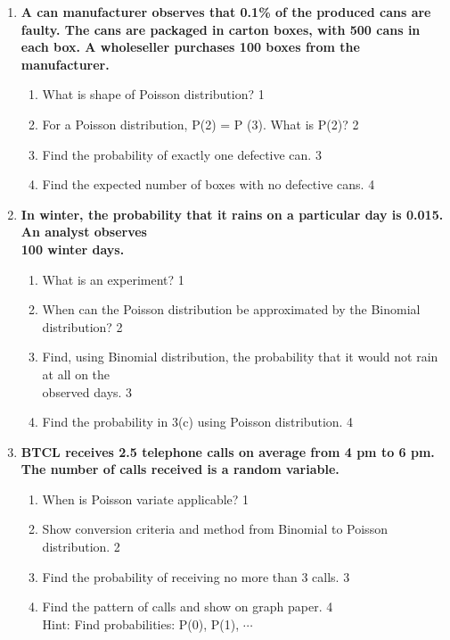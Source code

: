 \documentclass[a4paper,oneside, margin=1.4in]{book}
\begin{document}
\begin{enumerate}
 \item
	  \textbf{A can manufacturer observes that 0.1\% of the produced cans are faulty. The cans are packaged in carton boxes, with 500 cans in each box. A wholeseller purchases 100 boxes from the manufacturer.} 
  
  \begin{enumerate}
    \item
	What is shape of Poisson distribution? \hfill 1
    \item
	For a Poisson distribution, P(2) = P (3). What is P(2)? \hfill 2
    \item  
	Find the probability of exactly one defective can. \hfill 3
    \item
	Find the expected number of boxes with no defective cans. \hfill 4
  \end{enumerate}
  
  \item
  \textbf{In winter, the probability that it rains on a particular day is 0.015. An analyst observes \\ 100 winter days.}
 
  \begin{enumerate}
    \item
	What is an experiment? \hfill 1
    \item
    	When can the Poisson distribution be approximated by the Binomial distribution? \hfill 2
    \item
    	Find, using Binomial distribution, the probability that  it would not rain at all on the \\ observed days. \hfill 3
     \item
     	Find the probability in 3(c) using Poisson distribution.  \hfill 4
  \end{enumerate}

  \item
	  \textbf{BTCL receives 2.5 telephone calls on average from 4 pm to 6 pm. The number of calls received is a random variable. } 
  
  \begin{enumerate}
    \item
	When is Poisson variate applicable? \hfill 1
    \item
	Show conversion criteria and method from Binomial to Poisson distribution. \hfill 2
    \item  
	Find the probability of receiving no more than 3 calls. \hfill 3
    \item
	Find the pattern of calls and show on graph paper.  \hfill 4 \\
	Hint: Find probabilities: P(0), P(1), $\cdots$
  \end{enumerate}
  

\end{enumerate}
\end{document}
